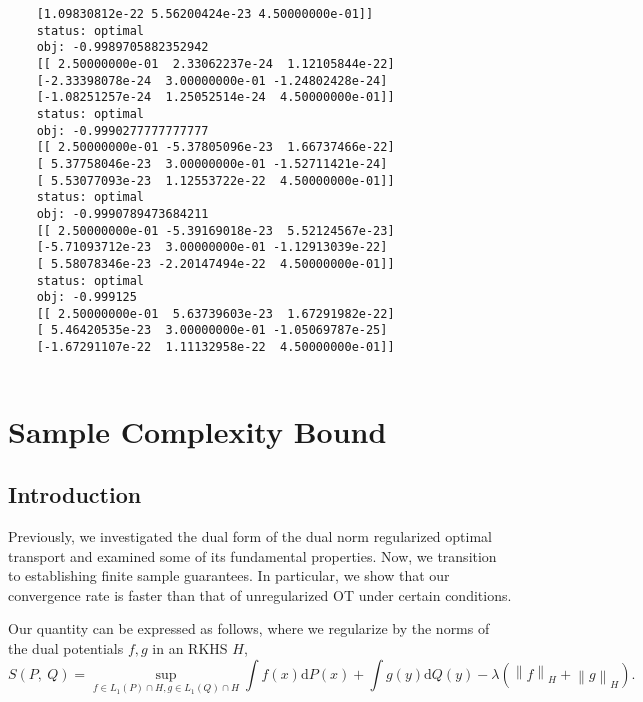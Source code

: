 \begin{lstlisting}
	[1.09830812e-22 5.56200424e-23 4.50000000e-01]]
	status: optimal
	obj: -0.9989705882352942
	[[ 2.50000000e-01  2.33062237e-24  1.12105844e-22]
	[-2.33398078e-24  3.00000000e-01 -1.24802428e-24]
	[-1.08251257e-24  1.25052514e-24  4.50000000e-01]]
	status: optimal
	obj: -0.9990277777777777
	[[ 2.50000000e-01 -5.37805096e-23  1.66737466e-22]
	[ 5.37758046e-23  3.00000000e-01 -1.52711421e-24]
	[ 5.53077093e-23  1.12553722e-22  4.50000000e-01]]
	status: optimal
	obj: -0.9990789473684211
	[[ 2.50000000e-01 -5.39169018e-23  5.52124567e-23]
	[-5.71093712e-23  3.00000000e-01 -1.12913039e-22]
	[ 5.58078346e-23 -2.20147494e-22  4.50000000e-01]]
	status: optimal
	obj: -0.999125
	[[ 2.50000000e-01  5.63739603e-23  1.67291982e-22]
	[ 5.46420535e-23  3.00000000e-01 -1.05069787e-25]
	[-1.67291107e-22  1.11132958e-22  4.50000000e-01]]
	
\end{lstlisting}


\section{Sample Complexity Bound}

	\subsection*{Introduction}
	Previously, we investigated the dual form of the dual norm regularized optimal transport and examined some of its fundamental properties. Now, we transition to establishing finite sample guarantees. In particular, we show that our convergence rate is faster than that of unregularized OT under certain conditions.

	Our quantity can be expressed as follows, where we regularize by the norms of the dual potentials $f,g$ in an RKHS $H$,
	$$S(P,\displaystyle \ Q)=\sup_{f\in L_{1}(P) \cap H,g\in L_{1}(Q) \cap H}\int f(x)\mathrm{d}P(x)+\int g(y)\mathrm{d}Q(y)-\lambda(\left\|f\right\|_H+\left\|g\right\|_H).$$
	
	
